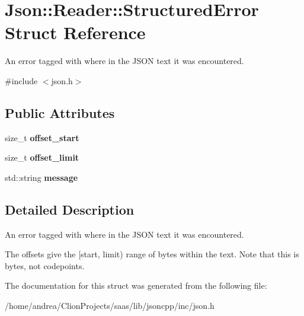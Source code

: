 \hypertarget{struct_json_1_1_reader_1_1_structured_error}{}\section{Json\+:\+:Reader\+:\+:Structured\+Error Struct Reference}
\label{struct_json_1_1_reader_1_1_structured_error}


An error tagged with where in the J\+S\+ON text it was encountered.  




{\ttfamily \#include $<$json.\+h$>$}

\subsection*{Public Attributes}
\begin{DoxyCompactItemize}
\item 
size\+\_\+t {\bfseries offset\+\_\+start}\hypertarget{struct_json_1_1_reader_1_1_structured_error_a160dae4eb3464a2209b743c755baf65f}{}\label{struct_json_1_1_reader_1_1_structured_error_a160dae4eb3464a2209b743c755baf65f}

\item 
size\+\_\+t {\bfseries offset\+\_\+limit}\hypertarget{struct_json_1_1_reader_1_1_structured_error_a80747dae744bcc80a9bc81c94fd42e13}{}\label{struct_json_1_1_reader_1_1_structured_error_a80747dae744bcc80a9bc81c94fd42e13}

\item 
std\+::string {\bfseries message}\hypertarget{struct_json_1_1_reader_1_1_structured_error_ab8755e5201b78c6ae077338f8819e6e6}{}\label{struct_json_1_1_reader_1_1_structured_error_ab8755e5201b78c6ae077338f8819e6e6}

\end{DoxyCompactItemize}


\subsection{Detailed Description}
An error tagged with where in the J\+S\+ON text it was encountered. 

The offsets give the \mbox{[}start, limit) range of bytes within the text. Note that this is bytes, not codepoints. 

The documentation for this struct was generated from the following file\+:\begin{DoxyCompactItemize}
\item 
/home/andrea/\+Clion\+Projects/saas/lib/jsoncpp/inc/json.\+h\end{DoxyCompactItemize}
